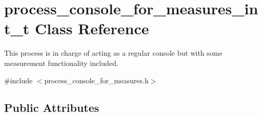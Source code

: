 \hypertarget{structprocess__console__for__measures__int__t}{\section{process\-\_\-console\-\_\-for\-\_\-measures\-\_\-int\-\_\-t Class Reference}
\label{structprocess__console__for__measures__int__t}
}


This process is in charge of acting as a regular console but with some measurement functionality included.  




{\ttfamily \#include $<$process\-\_\-console\-\_\-for\-\_\-measures.\-h$>$}

\subsection*{Public Attributes}
